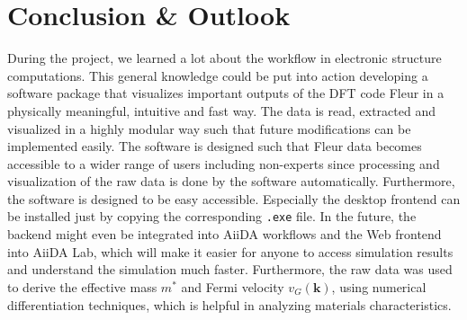 
\chapter{Conclusion \& Outlook}
\label{chap:conclusion}

During the project, we learned a lot about the workflow in electronic structure
computations. This general knowledge could be put into action developing a software package that visualizes important outputs of the DFT code Fleur in a physically meaningful, intuitive and fast way. The data is read, extracted and visualized in a highly modular way such that future modifications can be implemented easily. 
The software is designed such that Fleur data becomes accessible to a wider range of users including non-experts since processing and visualization of the raw data is done by the software automatically. Furthermore, the software is designed to be easy accessible. Especially the desktop frontend can be installed just by copying the corresponding \texttt{.exe} file. In the future, the backend might even be integrated into AiiDA workflows and the Web frontend into AiiDA Lab, which will make it easier for anyone to access simulation results and understand the simulation much faster.
Furthermore, the raw data was used to derive the effective mass $m^*$ and Fermi velocity $v_{G}(\mathbf{k})$, using numerical differentiation techniques, which is helpful in analyzing materials characteristics.



